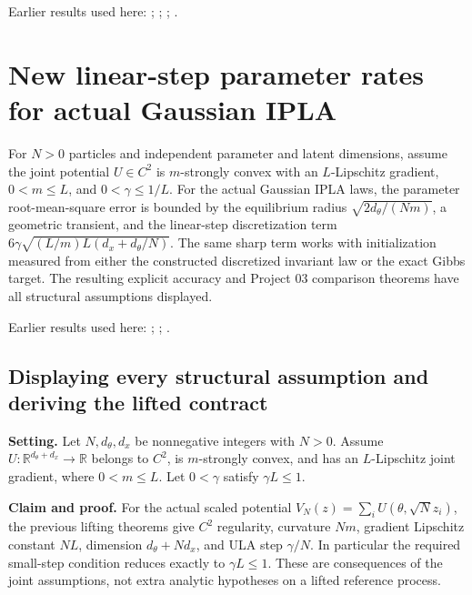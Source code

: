 \documentclass[11pt,a4paper]{report}
\begin{document}
Earlier results used here: \cite[Section~3.17.4]{LangevinLean2026ULASC}; \cite[Section~3.26.3]{LangevinLean2026ULASC}; \cite[Section~3.36.7]{LangevinLean2026ULASC}; \cite[Section~3.1.1]{LangevinLean2026IPLA}.
\section{\texorpdfstring{New linear-step parameter rates for actual Gaussian IPLA}{New linear-step parameter rates for actual Gaussian IPLA}}
\label{proof-module-WassersteinMixing-IPLA-lean}


For \(N>0\) particles and independent parameter and latent dimensions, assume the joint potential \(U\in C^2\) is \(m\)-strongly convex with an \(L\)-Lipschitz gradient, \(0<m\le L\), and \(0<\gamma\le1/L\). For the actual Gaussian IPLA laws, the parameter root-mean-square error is bounded by the equilibrium radius \(\sqrt{2d_\theta/(Nm)}\), a geometric transient, and the linear-step discretization term \(6\gamma\sqrt{(L/m)L(d_x+d_\theta/N)}\). The same sharp term works with initialization measured from either the constructed discretized invariant law or the exact Gibbs target. The resulting explicit accuracy and Project 03 comparison theorems have all structural assumptions displayed.



Earlier results used here: \cite[Section~3.13]{LangevinLean2026IPLA}; \cite[Section~3.4]{LangevinLean2026IPLA}; \cite[Section~3.5]{LangevinLean2026IPLA}.
\subsection{\texorpdfstring{Displaying every structural assumption and deriving the lifted contract}{Displaying every structural assumption and deriving the lifted contract}}
\label{report-step-WassersteinMixing-IPLA-lean-1}


\textbf{Setting.} Let \(N,d_\theta,d_x\) be nonnegative integers with \(N>0\). Assume \(U:\mathbb R^{d_\theta+d_x}\to\mathbb R\) belongs to \(C^2\), is \(m\)-strongly convex, and has an \(L\)-Lipschitz joint gradient, where \(0<m\le L\). Let \(0<\gamma\) satisfy \(\gamma L\le1\).




\textbf{Claim and proof.} For the actual scaled potential \(V_N(z)=\sum_iU(\theta,\sqrt N z_i)\), the previous lifting theorems give \(C^2\) regularity, curvature \(Nm\), gradient Lipschitz constant \(NL\), dimension \(d_\theta+Nd_x\), and ULA step \(\gamma/N\). In particular the required small-step condition reduces exactly to \(\gamma L\le1\). These are consequences of the joint assumptions, not extra analytic hypotheses on a lifted reference process.
\end{document}
